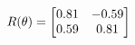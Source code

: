 \documentclass[preview]{standalone}
\begin{document}
\begin{align*}
\special{dvisvgm:raw <g id='unique000'>}R(\theta) = \begin{bmatrix}0.81 & -0.59\\0.59 & 0.81\end{bmatrix}\special{dvisvgm:raw </g>}
\end{align*}
\end{document}
